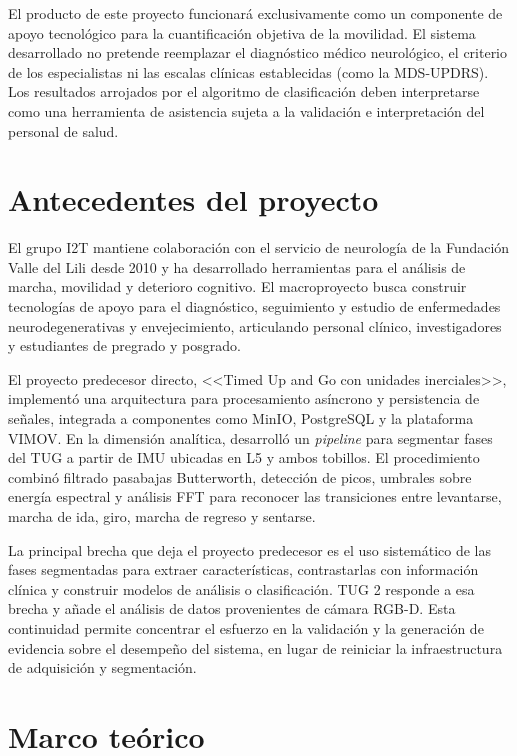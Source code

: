 \documentclass[12pt,a4paper]{article}
\begin{document}
El producto de este proyecto funcionará exclusivamente como un componente de apoyo tecnológico para la cuantificación objetiva de la movilidad. El sistema desarrollado no pretende reemplazar el diagnóstico médico neurológico, el criterio de los especialistas ni las escalas clínicas establecidas (como la MDS-UPDRS). Los resultados arrojados por el algoritmo de clasificación deben interpretarse como una herramienta de asistencia sujeta a la validación e interpretación del personal de salud.

\section{Antecedentes del proyecto}\label{sec:antecedentes}

El grupo I2T mantiene colaboración con el servicio de neurología de la Fundación Valle del Lili desde 2010 y ha desarrollado herramientas para el análisis de marcha, movilidad y deterioro cognitivo. El macroproyecto busca construir tecnologías de apoyo para el diagnóstico, seguimiento y estudio de enfermedades neurodegenerativas y envejecimiento, articulando personal clínico, investigadores y estudiantes de pregrado y posgrado.

El proyecto predecesor directo, <<Timed Up and Go con unidades inerciales>>, implementó una arquitectura para procesamiento asíncrono y persistencia de señales, integrada a componentes como MinIO, PostgreSQL y la plataforma VIMOV. En la dimensión analítica, desarrolló un \emph{pipeline} para segmentar fases del TUG a partir de IMU ubicadas en L5 y ambos tobillos. El procedimiento combinó filtrado pasabajas Butterworth, detección de picos, umbrales sobre energía espectral y análisis FFT para reconocer las transiciones entre levantarse, marcha de ida, giro, marcha de regreso y sentarse.

La principal brecha que deja el proyecto predecesor es el uso sistemático de las fases segmentadas para extraer características, contrastarlas con información clínica y construir modelos de análisis o clasificación. TUG 2 responde a esa brecha y añade el análisis de datos provenientes de cámara RGB-D. Esta continuidad permite concentrar el esfuerzo en la validación y la generación de evidencia sobre el desempeño del sistema, en lugar de reiniciar la infraestructura de adquisición y segmentación.

\section{Marco teórico}\label{sec:marco-teorico}
\end{document}
